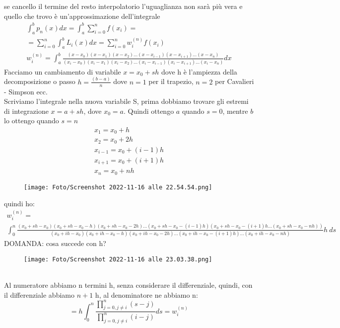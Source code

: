 \documentclass[a4paper, portrait]{book}
\numberwithin{equation}{chapter} %
\begin{document}
se cancello il termine del resto interpolatorio l'uguaglianza non sarà più vera e quello che trovo è un'approssimazione dell'integrale
\begin{gather}
    \int_a^b p_n(x) dx = \int_a^b \sum_{i=0}^{n}f(x_i) = \\
    = \sum_{i=0}^{n}\int_a^b L_i(x) dx = \sum_{i=0}^n w_i^{(n)}f(x_i)\\
    w_i^{(n)} = \int_a^b \frac{(x-x_0)(x-x_1)(x-x_2)...(x-x_{i-1})(x-x_{i+1})...(x-x_n)}{(x_i-x_0)(x_i-x_1)(x_i-x_2)...(x_i-x_{i-1})(x_i-x_{i+1})...(x_i-x_n)} dx
\end{gather}
Facciamo un cambiamento di variabile
$x = x_0 +sh$ dove h è l'ampiezza della decomposizione o passo $h = \frac{(b-a)}{n}$ dove $n = 1$ per il trapezio, $n = 2$ per Cavalieri - Simpson ecc.\\
Scriviamo l'integrale nella nuova variabile S, prima dobbiamo trovare gli estremi di integrazione $x = a+sh$, dove $x_0 = a$. Quindi ottengo $a$ quando $s = 0$, mentre $b$ lo ottengo quando $s = n$
\begin{gather}
    x_1 = x_0 + h\\
    x_2 = x_0 + 2h\\
    x_{i-1} = x_0 + (i-1)h\\
    x_{i+1} = x_0 + (i+1)h\\
    x_n = x_0 + nh
\end{gather}
\begin{figure}[h!]
    \centering
    \texttt{[image: Foto/Screenshot 2022-11-16 alle 22.54.54.png]}
    \caption{}
\end{figure}
quindi ho:
{\small
\begin{gather}
    w_i^{(n)} = \\
    \int_0^n \frac{(x_0+sh-x_0)(x_0+sh-x_0-h)(x_0+sh-x_0-2h)...(x_0+sh-x_0-(i-1)h)(x_0+sh-x_0-(i+1)h...(x_0+sh-x_0-nh))}{(x_0+ih-x_0)(x_0+ih-x_0-h)(x_0+ih-x_0-2h)...(x_0+ih-x_0-(i+1)h)...(x_0+ih-x_0-nh)} h \ ds
\end{gather}}
\newpage
DOMANDA: cosa succede con h?
\begin{figure}[h!]
    \centering
    \texttt{[image: Foto/Screenshot 2022-11-16 alle 23.03.38.png]}
    \caption{}
\end{figure}
\\Al numeratore abbiamo n termini h, senza considerare il differenziale, quindi, con il differenziale abbiamo $n+1$ h, al denominatore ne abbiamo n:
\begin{equation}
    = h \int_0^n \frac{\prod_{j=0, j\neq i}^{n}(s-j)}{\prod_{j=0,j\neq i}^{n}(i-j)}ds = w_i^{(n)}
\end{equation}
\end{document}
